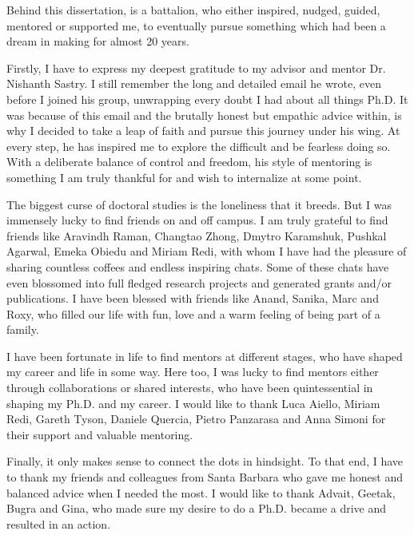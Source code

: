 
\begin{acknowledgements}      

Behind this dissertation, is a battalion, who either inspired, nudged, guided, mentored or supported me, to eventually pursue something which had been a dream in making for almost 20 years. 

Firstly, I have to express my deepest gratitude to my advisor and mentor Dr. Nishanth Sastry. I still remember the long and detailed email he wrote, even before I joined his group, unwrapping every doubt I had about all things Ph.D. It was because of this email and the brutally honest but empathic advice within, is why I decided to take a leap of faith and pursue this journey under his wing.  At every step, he has inspired me to explore the difficult and be fearless doing so. With a deliberate balance of control and freedom, his style of mentoring is something I am truly thankful for and wish to internalize at some point.

The biggest curse of doctoral studies is the loneliness that it breeds. But I was immensely lucky to find friends on and off campus. I am truly grateful to find friends like Aravindh Raman, Changtao Zhong, Dmytro Karamshuk, Pushkal Agarwal, Emeka Obiedu and Miriam Redi, with whom I have had the pleasure of sharing countless coffees and endless inspiring chats. Some of these chats have even blossomed into full fledged research projects and generated grants and/or publications. I have been blessed with friends like Anand, Sanika, Marc and Roxy, who filled our life with fun, love and a warm feeling of being part of a family. 

I have been fortunate in life to find mentors at different stages, who have shaped my career and life in some way. Here too, I was lucky to find mentors either through collaborations or shared interests, who have been quintessential in shaping my Ph.D. and my career. I would like to thank Luca Aiello, Miriam Redi, Gareth Tyson, Daniele Quercia, Pietro Panzarasa and Anna Simoni for their support and valuable mentoring. 

Finally, it only makes sense to connect the dots in hindsight. To that end, I have to thank my friends and colleagues from Santa Barbara who gave me honest and balanced advice when I needed the most. I would like to thank Advait, Geetak, Bugra and Gina, who made sure my desire to do a Ph.D. became a drive and resulted in an action. 


\end{acknowledgements}
